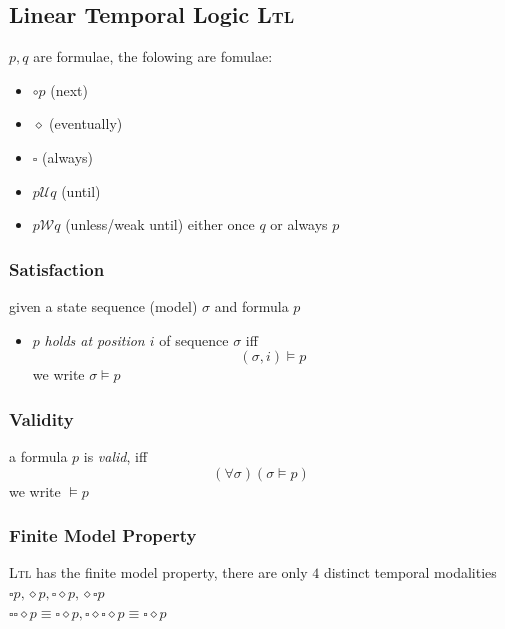 \documentclass[a4paper, 10pt]{article}
\begin{document}
\subsection*{Linear Temporal Logic \textsc{Ltl}}
$p,q$ are formulae, the folowing are fomulae:
\begin{itemize}
    \item $\circ p$ (next)
    \item $\diamond$ (eventually)
    \item $\square$ (always)
    \item $p \mathcal{U}q$ (until)
    \item $p \mathcal{W}q$ (unless/weak until) {\tiny either once $q$ or always $p$}
\end{itemize}
\subsubsection*{Satisfaction}
given a state sequence (model) $\sigma$ and formula $p$
\begin{itemize}
    \item $p$ \emph{holds at position $i$} of sequence $\sigma$ iff \[ (\sigma,i) \models p \] we write $\sigma\models p$
\end{itemize}
\subsubsection*{Validity}
a formula $p$ is \emph{valid}, iff \[ (\forall\sigma)(\sigma\models p) \] we write $\models p$
\subsubsection*{Finite Model Property}
\textsc{Ltl} has the finite model property, there are only $4$ distinct temporal modalities \\
$\square p, \diamond p, \square\diamond p, \diamond\square p$ \\
$\square\square\diamond p\equiv\square\diamond p, \square\diamond\square\diamond p\equiv\square\diamond p$
\end{document}
